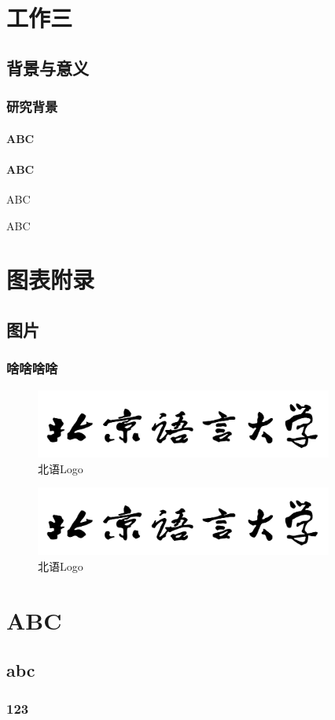 \documentclass[doctor,final,twoside]{BLCUThesis}
\begin{document}
\chapter{工作三}
\section{背景与意义}
\subsection{研究背景}
\subsubsection{ABC}
\subsubsection{ABC}
ABC\citet{Xiang:20}

ABC\citep{Xiang:20}

\nocite{*}



\appendix

\chapter{图表附录}
\section{图片}
\subsection{啥啥啥啥}
\begin{figure}[h]
	\centering
	\includegraphics[width=9.8cm]{figures/BLCULogoText.png}
	\caption{北语Logo}
\end{figure}

\begin{figure}[h]
	\centering
	\includegraphics[width=9.8cm]{figures/BLCULogoText.png}
	\caption{北语Logo}
\end{figure}

\chapter{ABC}
\section{abc}
\subsection{123}
\end{document}
